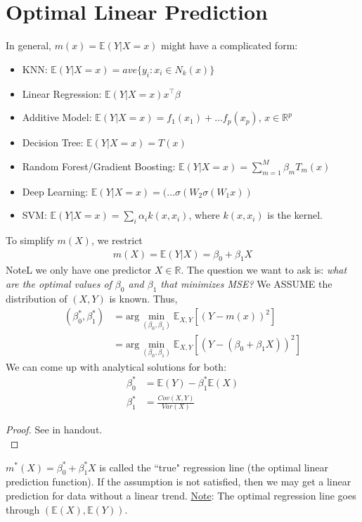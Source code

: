 \documentclass{article}
\newcommand{\E}{\mathbb{E}}
\newcommand{\R}{\mathbb{R}}
\newcommand{\argmin}{\text{arg}\min}
\begin{document}
\section{Optimal Linear Prediction}
In general, $m(x) = \E(Y|X = x)$ might have a complicated form:
\begin{itemize}
    \item KNN: $\E(Y|X = x) = ave\{y_i : x_i \in N_k(x)\}$
    \item Linear Regression: $\E(Y|X = x) x^\top\beta$
    \item Additive Model: $\E(Y|X = x) = f_1(x_1) + \ldots f_p(x_p)$, $x \in \R^p$
    \item Decision Tree: $\E(Y|X = x) = T(x)$
    \item Random Forest/Gradient Boosting: $\E(Y|X = x) = \sum_{m=1}^M\beta_mT_m(x)$
    \item Deep Learning: $\E(Y|X = x) = (\ldots \sigma(W_2\sigma(W_1x))$
    \item SVM: $\E(Y|X = x) = \sum_i \alpha_i k(x,x_i)$, where $k(x,x_i)$ is the kernel.
\end{itemize}
To simplify $m(X)$, we restrict 
\begin{align}
m(X) = \E(Y|X) = \beta_0 + \beta_1X    
\end{align}
NoteL we only have one predictor $X \in \R$.
\bigbreak\noindent
The question we want to ask is: \textit{what are the optimal values of $\beta_0$ and $\beta_1$ that minimizes MSE?}
\bigbreak\noindent
We ASSUME the distribution of $(X,Y)$ is known. Thus,
\begin{align}
    (\beta_0^*,\beta_1^*) &= \argmin_{(\beta_0,\beta_1)}\E_{X,Y}[(Y-m(x))^2]\\
    &= \argmin_{(\beta_0,\beta_1)}\E_{X,Y}[(Y-(\beta_0 + \beta_1X))^2]
\end{align}
We can come up with analytical solutions for both:
\begin{align}
    \beta_0^* &= \E(Y) - \beta_1^*\E(X)\\
    \beta_1^* &= \frac{Cov(X,Y)}{Var(X)}
\end{align}
\begin{proof}
    See in handout.\\
\end{proof}
\noindent
$m^*(X) = \beta_0^* + \beta_1^*X$ is called the ``true" regression line (the optimal linear prediction function). If the assumption is not satisfied, then we may get a linear prediction for data without a linear trend.
\bigbreak\noindent
\underline{Note}: The optimal regression line goes through $(\E(X), \E(Y))$.
\end{document}
